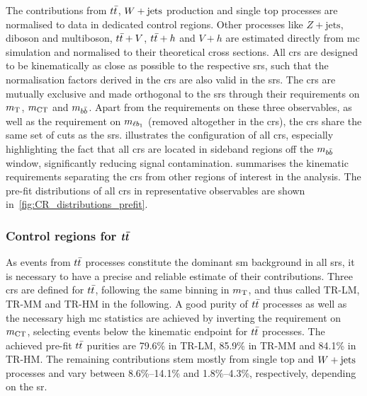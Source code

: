 The contributions from $\ttbar$, $W+\mathrm{jets}$ production and single top processes are normalised to data in dedicated control regions. Other processes like $Z+\mathrm{jets}$, diboson and multiboson, $t\bar{t}+V$, $t\bar{t}+h$ and $V+h$ are estimated directly from \gls{mc} simulation and normalised to their theoretical cross sections. All \glspl{cr} are designed to be kinematically as close as possible to the respective \glspl{sr}, such that the normalisation factors derived in the \glspl{cr} are also valid in the \glspl{sr}. The \glspl{cr} are mutually exclusive and made orthogonal to the \glspl{sr} through their requirements on $m_{\textrm{T}}$, $m_{\textrm{CT}}$ and $m_{b\bar{b}}$. Apart from the requirements on these three observables, as well as the requirement on $m_{\ell b_{1}}$ (removed altogether in the \glspl{cr}), the \glspl{cr} share the same set of cuts as the \glspl{sr}.  illustrates the configuration of all \glspl{cr}, especially highlighting the fact that all \glspl{cr} are located in sideband regions off the $m_{b\bar{b}}$ window, significantly reducing signal contamination.  summarises the kinematic requirements separating the \glspl{cr} from other regions of interest in the analysis. The pre-fit distributions of all \glspl{cr} in representative observables are shown in~\cref{fig:CR_distributions_prefit}.

\subsubsection[Control regions for $\ttbar$]{Control regions for $\boldsymbol{t\bar{t}}$}

As events from $\ttbar$ processes constitute the dominant \gls{sm} background in all \glspl{sr}, it is necessary to have a precise and reliable estimate of their contributions. Three \glspl{cr} are defined for $\ttbar$, following the same binning in $m_{\textrm{T}}$, and thus called TR-LM, TR-MM and TR-HM in the following. A good purity of $\ttbar$ processes as well as the necessary high \gls{mc} statistics are achieved  by inverting the requirement on $m_{\textrm{CT}}$, selecting events below the kinematic endpoint for $\ttbar$ processes. The achieved pre-fit $\ttbar$ purities are 79.6\% in TR-LM, 85.9\% in TR-MM and 84.1\% in TR-HM. The remaining contributions stem mostly from single top and $W+\mathrm{jets}$ processes and vary between 8.6\%--14.1\% and 1.8\%--4.3\%, respectively, depending on the \gls{sr}. 

